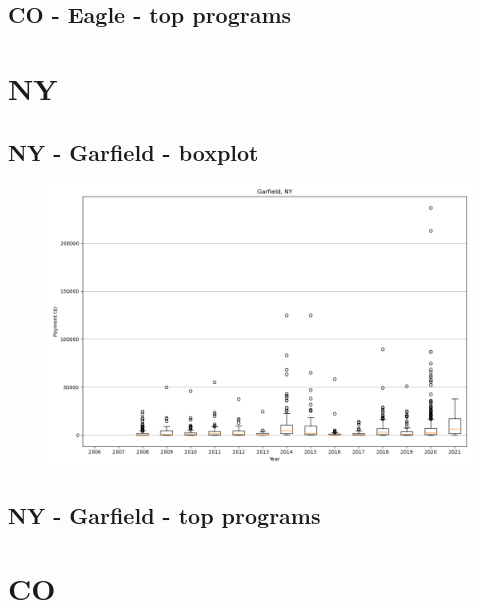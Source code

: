 \subsection*{CO - Eagle - top programs}

\newpage
\section*{NY}
\subsection*{NY - Garfield - boxplot}
\begin{figure}[h]
\centering
\includegraphics[width=7in]{../output/boxplots/counties/Garfield-NY_boxplot.png}
\end{figure}


\subsection*{NY - Garfield - top programs}

\newpage
\section*{CO}
